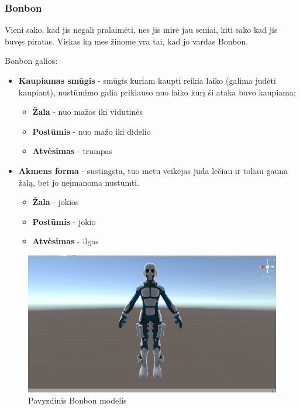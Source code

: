 \documentclass{VUMIFPSkursinis}
\begin{document}
\subsubsection{Bonbon}
Vieni sako, kad jis negali pralaimėti, nes jis mirė jau seniai, kiti sako kad jis buvęs piratas. Viskas ką mes žinome yra tai, kad jo vardas Bonbon. 

Bonbon galios:
\begin{itemize}
    \item \textbf{Kaupiamas smūgis} - smūgis kuriam kaupti reikia laiko (galima judėti kaupiant), nustūmimo galia priklauso nuo laiko kurį ši ataka buvo kaupiama;
    \begin{itemize}
        \item \textbf{Žala} - nuo mažos iki vidutinės
        \item \textbf{Postūmis} - nuo mažo iki didelio
        \item \textbf{Atvėsimas} - trumpas
    \end{itemize}
    \item \textbf{Akmens forma} - sustingsta, tuo metu veikėjas juda lėčiau ir toliau gauna žalą, bet jo neįmanoma nustumti.
    \begin{itemize}
        \item \textbf{Žala} - jokios
        \item \textbf{Postūmis} - jokio
        \item \textbf{Atvėsimas} - ilgas
    \end{itemize}
\end{itemize}

\begin{figure}[H]
    \centering
    \includegraphics[scale=0.3]{img/Characters/Bonbon.png}
    \caption{Pavyzdinis Bonbon modelis}
    \label{img:bonbon}
\end{figure}
\end{document}
